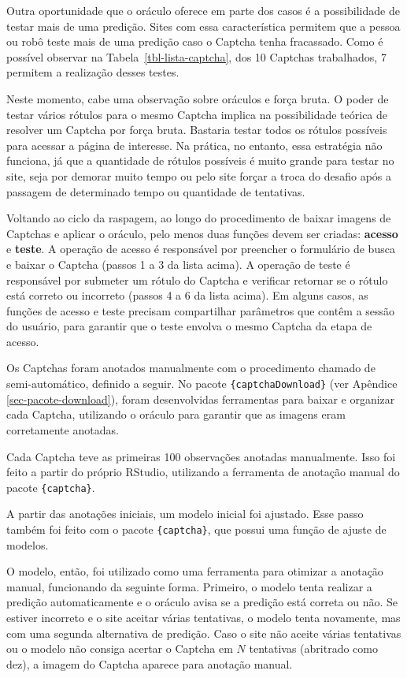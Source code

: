 \documentclass[12pt,twoside,brazilian]{book}
\begin{document}
Outra oportunidade que o oráculo oferece em parte dos casos é a
possibilidade de testar mais de uma predição. Sites com essa
característica permitem que a pessoa ou robô teste mais de uma predição
caso o Captcha tenha fracassado. Como é possível observar na
Tabela~\ref{tbl-lista-captcha}, dos 10 Captchas trabalhados, 7 permitem
a realização desses testes.

Neste momento, cabe uma observação sobre oráculos e força bruta. O poder
de testar vários rótulos para o mesmo Captcha implica na possibilidade
teórica de resolver um Captcha por força bruta. Bastaria testar todos os
rótulos possíveis para acessar a página de interesse. Na prática, no
entanto, essa estratégia não funciona, já que a quantidade de rótulos
possíveis é muito grande para testar no site, seja por demorar muito
tempo ou pelo site forçar a troca do desafio após a passagem de
determinado tempo ou quantidade de tentativas.

Voltando ao ciclo da raspagem, ao longo do procedimento de baixar
imagens de Captchas e aplicar o oráculo, pelo menos duas funções devem
ser criadas: \textbf{acesso} e \textbf{teste}. A operação de acesso é
responsável por preencher o formulário de busca e baixar o Captcha
(passos 1 a 3 da lista acima). A operação de teste é responsável por
submeter um rótulo do Captcha e verificar retornar se o rótulo está
correto ou incorreto (passos 4 a 6 da lista acima). Em alguns casos, as
funções de acesso e teste precisam compartilhar parâmetros que contêm a
sessão do usuário, para garantir que o teste envolva o mesmo Captcha da
etapa de acesso.

Os Captchas foram anotados manualmente com o procedimento chamado de
semi-automático, definido a seguir. No pacote
\texttt{\{captchaDownload\}} (ver Apêndice \ref{sec-pacote-download}),
foram desenvolvidas ferramentas para baixar e organizar cada Captcha,
utilizando o oráculo para garantir que as imagens eram corretamente
anotadas.

Cada Captcha teve as primeiras 100 observações anotadas manualmente.
Isso foi feito a partir do próprio RStudio, utilizando a ferramenta de
anotação manual do pacote \texttt{\{captcha\}}.

A partir das anotações iniciais, um modelo inicial foi ajustado. Esse
passo também foi feito com o pacote \texttt{\{captcha\}}, que possui uma
função de ajuste de modelos.

O modelo, então, foi utilizado como uma ferramenta para otimizar a
anotação manual, funcionando da seguinte forma. Primeiro, o modelo tenta
realizar a predição automaticamente e o oráculo avisa se a predição está
correta ou não. Se estiver incorreto e o site aceitar várias tentativas,
o modelo tenta novamente, mas com uma segunda alternativa de predição.
Caso o site não aceite várias tentativas ou o modelo não consiga acertar
o Captcha em \(N\) tentativas (abritrado como dez), a imagem do Captcha
aparece para anotação manual.
\end{document}
